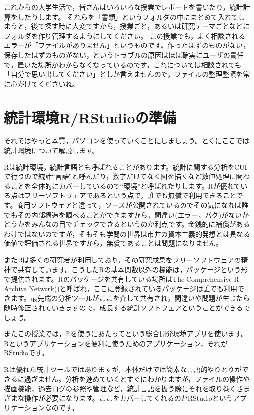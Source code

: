 \documentclass{ltjsbook}
\begin{document}
これからの大学生活で，皆さんはいろいろな授業でレポートを書いたり，統計計算をしたりします。
それらを「書類」というフォルダの中にまとめて入れてしまうと，後で探す時に大変ですから，授業ごと，あるいは研究テーマごとなどにフォルダを作り管理するようにしてください。
この授業でも，よく相談されるエラーが「ファイルがありません」というものです。作ったはずのものがない，保存したはずのものがない，というトラブルの原因はほぼ確実にユーザの責任で，置いた場所がわからなくなっているのです。これについては相談されても「自分で思い出してください」としか言えませんので，ファイルの整理整頓を常に心がけてくださいね。

\section{統計環境R/RStudioの準備}
それではやっと本質，パソコンを使っていくことにしましょう。とくにここでは統計環境について解説します。

Rは統計環境，統計言語とも呼ばれることがあります。統計に関する分析をCUIで行うので統計``言語''と呼んだり，数字だけでなく図を描くなど数値処理に関わることを全体的にカバーしているので``環境''と呼ばれたりします。Rが優れている点はフリーソフトウェアであるという点で，誰でも無償で利用できることです。商用ソフトウェアと違って，ソースが公開されているのでその気になれば誰でもその内部構造を調べることができますから，間違い(エラー，バグ)がないかどうかをみんなの目でチェックできるというのが利点です。金銭的に補償があるわけではないのですが，そもそも学問の世界は市井の資本主義的発想とは異なる価値で評価される世界ですから，無償であることは問題になりません。

またRは多くの研究者が利用しており，その研究成果をフリーソフトウェアの精神で共有しています。こうしたRの基本関数以外の機能は，パッケージという形で提供されます。Rのパッケージを共有している場所はThe Comprehensive R Archive Network()と呼ばれ，ここに登録されているパッケージは誰でも利用できます。最先端の分析ツールがここを介して共有され，間違いや問題が生じたら随時修正されていきますので，成長する統計ソフトウェアということができるでしょう。

またこの授業では，Rを使うにあたってという総合開発環境アプリを使います。Rというアプリケーションを便利に使うためのアプリケーション，それがRStudioです。

Rは優れた統計ツールではありますが，本体だけでは簡素な言語的やりとりができるに過ぎません。分析を進めていくとすぐにわかりますが，ファイルの操作や描画機能，過去ログの参照や管理など，統計言語を扱う際にそれを取り巻くさまざまな操作が必要になります。ここをカバーしてくれるのがRStudioというアプリケーションなのです。
\end{document}
